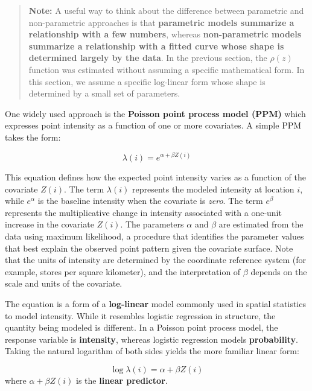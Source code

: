\documentclass[
  letterpaper,
]{book}
\begin{document}
\begin{quote}
\textbf{Note:} A useful way to think about the difference between
parametric and non-parametric approaches is that \textbf{parametric
models summarize a relationship with a few numbers}, whereas
\textbf{non-parametric models summarize a relationship with a fitted
curve whose shape is determined largely by the data}. In the previous
section, the \(\rho(z)\) function was estimated without assuming a
specific mathematical form. In this section, we assume a specific
log-linear form whose shape is determined by a small set of parameters.
\end{quote}

One widely used approach is the \textbf{Poisson point process model
(PPM)} which expresses point intensity as a function of one or more
covariates. A simple PPM takes the form:

\begin{equation}
\lambda(i) = e^{\alpha + \beta Z(i)}
\label{eq:density-covariate}
\end{equation}

This equation defines how the expected point intensity varies as a
function of the covariate \(Z(i)\). The term \(\lambda(i)\) represents
the modeled intensity at location \(i\), while \(e^{\alpha}\) is the
baseline intensity when the covariate is \emph{zero}. The term
\(e^{\beta}\) represents the multiplicative change in intensity
associated with a one-unit increase in the covariate \(Z(i)\). The
parameters \(\alpha\) and \(\beta\) are estimated from the data using
maximum likelihood, a procedure that identifies the parameter values
that best explain the observed point pattern given the covariate
surface. Note that the units of intensity are determined by the
coordinate reference system (for example, stores per square kilometer),
and the interpretation of \(\beta\) depends on the scale and units of
the covariate.

The equation is a form of a \textbf{log-linear} model commonly used in
spatial statistics to model intensity. While it resembles logistic
regression in structure, the quantity being modeled is different. In a
Poisson point process model, the response variable is
\textbf{intensity}, whereas logistic regression models
\textbf{probability}. Taking the natural logarithm of both sides yields
the more familiar linear form:

\[
\log{\lambda}(i) = \alpha + \beta Z(i)
\] where \(\alpha + \beta Z(i)\) is the \textbf{linear predictor}.
\end{document}
